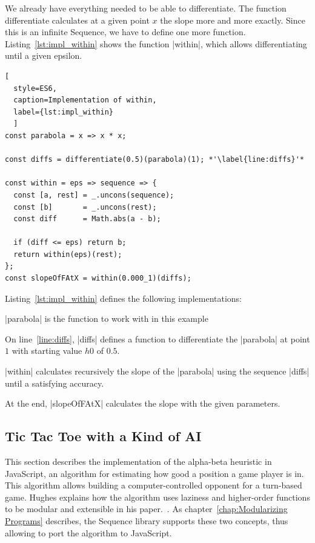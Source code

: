 We already have everything needed to be able to differentiate.  The function
differentiate calculates at a given point $x$ the slope more and more exactly.
Since this is an infinite Sequence, we have to define one more function.
Listing~\ref{lst:impl_within} shows the function |within|, which allows differentiating until a
given epsilon.

\begin{lstlisting}[
  style=ES6, 
  caption=Implementation of within,
  label={lst:impl_within}
  ]
const parabola = x => x * x;

const diffs = differentiate(0.5)(parabola)(1); *'\label{line:diffs}'*

const within = eps => sequence => {
  const [a, rest] = _.uncons(sequence);
  const [b]       = _.uncons(rest);
  const diff      = Math.abs(a - b);

  if (diff <= eps) return b;
  return within(eps)(rest);
};
const slopeOfFAtX = within(0.000_1)(diffs);
\end{lstlisting}

Listing~\ref{lst:impl_within} defines the following implementations:

\begin{itemize}
  \item{|parabola| is the function to work with in this example}
  \item{On line~\ref{line:diffs}, |diffs| defines a function to differentiate the |parabola| at point $1$ with
    starting value $h0$ of $0.5$.}
  \item{|within| calculates recursively the slope of the |parabola| using the
      sequence |diffs| until a satisfying accuracy. 
    \item{ At the end, |slopeOfFAtX| calculates the slope with the given parameters. }
    }
\end{itemize}


\subsection{Tic Tac Toe with a Kind of AI}
\label{sub:Alpha - Beta Algorithm}
This section describes the implementation of the alpha-beta heuristic in
JavaScript, an algorithm for estimating how good a position a game player is
in. \\ 
This algorithm allows building a computer-controlled opponent for a
turn-based game. Hughes explains how the algorithm uses laziness and
higher-order functions to be modular and extensible in his paper.~\cite[p.
16]{hughes_why_1989}. As chapter~\ref{chap:Modularizing Programs} describes, the
Sequence library supports these two concepts, thus allowing to port the
algorithm to JavaScript.

